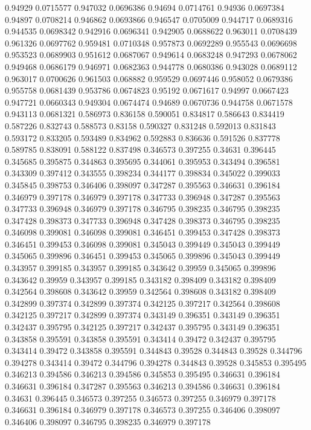 0.94929 0.0715577
0.947032 0.0696386
0.94694 0.0714761
0.94936 0.0697384
0.94897 0.0708214
0.946862 0.0693866
0.946547 0.0705009
0.944717 0.0689316
0.944535 0.0698342
0.942916 0.0696341
0.942905 0.0688622
0.963011 0.0708439
0.961326 0.0697762
0.959481 0.0710348
0.957873 0.0692289
0.955543 0.0696698
0.953523 0.0689903
0.951612 0.0687067
0.949614 0.0683248
0.947293 0.0678062
0.949468 0.0686179
0.946971 0.0682363
0.944778 0.0680386
0.943028 0.0689112
0.963017 0.0700626
0.961503 0.068882
0.959529 0.0697446
0.958052 0.0679386
0.955758 0.0681439
0.953786 0.0674823
0.95192 0.0671617
0.94997 0.0667423
0.947721 0.0660343
0.949304 0.0674474
0.94689 0.0670736
0.944758 0.0671578
0.943113 0.0681321
0.586973 0.836158
0.590051 0.834817
0.586643 0.834419
0.587226 0.832743
0.588573 0.83158
0.590327 0.831248
0.592013 0.831843
0.593172 0.833205
0.593489 0.834962
0.592883 0.836636
0.591526 0.837778
0.589785 0.838091
0.588122 0.837498
0.346573 0.397255
0.34631 0.396445
0.345685 0.395875
0.344863 0.395695
0.344061 0.395953
0.343494 0.396581
0.343309 0.397412
0.343555 0.398234
0.344177 0.398834
0.345022 0.399033
0.345845 0.398753
0.346406 0.398097
0.347287 0.395563
0.346631 0.396184
0.346979 0.397178
0.346979 0.397178
0.347733 0.396948
0.347287 0.395563
0.347733 0.396948
0.346979 0.397178
0.346795 0.398235
0.346795 0.398235
0.347428 0.398373
0.347733 0.396948
0.347428 0.398373
0.346795 0.398235
0.346098 0.399081
0.346098 0.399081
0.346451 0.399453
0.347428 0.398373
0.346451 0.399453
0.346098 0.399081
0.345043 0.399449
0.345043 0.399449
0.345065 0.399896
0.346451 0.399453
0.345065 0.399896
0.345043 0.399449
0.343957 0.399185
0.343957 0.399185
0.343642 0.39959
0.345065 0.399896
0.343642 0.39959
0.343957 0.399185
0.343182 0.398409
0.343182 0.398409
0.342564 0.398608
0.343642 0.39959
0.342564 0.398608
0.343182 0.398409
0.342899 0.397374
0.342899 0.397374
0.342125 0.397217
0.342564 0.398608
0.342125 0.397217
0.342899 0.397374
0.343149 0.396351
0.343149 0.396351
0.342437 0.395795
0.342125 0.397217
0.342437 0.395795
0.343149 0.396351
0.343858 0.395591
0.343858 0.395591
0.343414 0.39472
0.342437 0.395795
0.343414 0.39472
0.343858 0.395591
0.344843 0.39528
0.344843 0.39528
0.344796 0.394278
0.343414 0.39472
0.344796 0.394278
0.344843 0.39528
0.345853 0.395495
0.346213 0.394586
0.346213 0.394586
0.345853 0.395495
0.346631 0.396184
0.346631 0.396184
0.347287 0.395563
0.346213 0.394586
0.346631 0.396184
0.34631 0.396445
0.346573 0.397255
0.346573 0.397255
0.346979 0.397178
0.346631 0.396184
0.346979 0.397178
0.346573 0.397255
0.346406 0.398097
0.346406 0.398097
0.346795 0.398235
0.346979 0.397178
